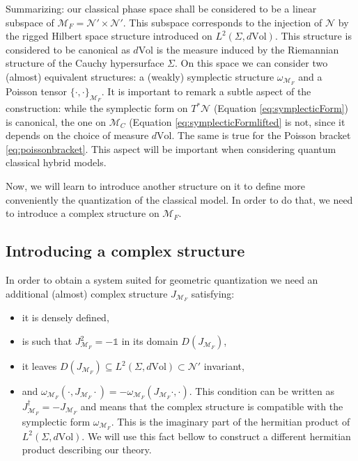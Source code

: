 \documentclass{elsarticle}%
\begin{document}
Summarizing: our classical phase space shall be considered to be a linear subspace of $\mathcal{M}_F=\mathcal{N}'\times \mathcal{N}'$. This subspace  corresponds to the injection of $\mathcal{N}$ by the rigged Hilbert space structure introduced on $L^2(\Sigma, d\textrm{Vol})$. This structure is considered to be canonical as $d\textrm{Vol}$ is the measure induced by the Riemannian structure of the Cauchy hypersurface $\Sigma$. On this space we can consider two (almost) equivalent structures: a (weakly) symplectic structure $\omega_{\mathcal{M}_F}$ and a Poisson tensor $\{ \cdot, \cdot \}_{\mathcal{M}_F}$.
It is important to remark a subtle aspect of the construction: while the symplectic form on $T^*\mathcal{N}$ (Equation \eqref{eq:symplecticForm}) is canonical, the one on $\mathcal{M}_C$ (Equation \eqref{eq:symplecticFormlifted}   is not, since it depends on the choice of measure $d\mathrm{Vol}$. The same is true for the Poisson bracket \eqref{eq:poissonbracket}. This aspect will be important when considering quantum classical hybrid models.


Now, we will learn to introduce another structure on it to define more conveniently the quantization of the classical model. In order to do that, we need to introduce a complex structure on $\mathcal{M}_F$.

\subsection{Introducing a complex structure}
In order to obtain a system suited for geometric quantization we need an additional (almost) complex structure $J_{\mathcal{M}_F}$ satisfying:
\begin{itemize}
	\item it is densely defined,
	\item is such that $J_{\mathcal{M}_F}^2=-\mathds{1}$ in its domain $D(J_{\mathcal{M}_F})$,
 \item   it leaves $D(J_{\mathcal{M}_F})\subseteq L^2(\Sigma,d\textrm{Vol})\subset \mathcal{N}'$ invariant,
 \item  and $\omega_{\mathcal{M}_F}( \cdot ,J_{\mathcal{M}_F}\cdot )=-\omega_{\mathcal{M}_F}( J_{\mathcal{M}_F}\cdot ,\cdot ).$ This condition can be written as $J_{\mathcal{M}_F}^\dagger= -J_{\mathcal{M}_F}$ and means that the complex structure is compatible with the symplectic form $\omega_{\mathcal{M}_F}$. This is the imaginary part of the hermitian product of $L^2(\Sigma,d\textrm{Vol})$. We will use this fact bellow to construct a different hermitian product describing our theory. 
\end{itemize}
\end{document}
